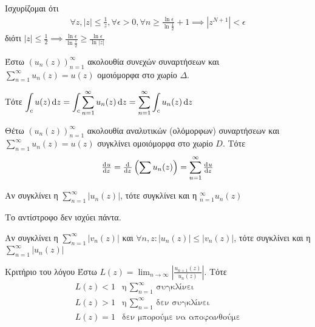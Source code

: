 \documentclass[12pt,a4paper,titlepage,fleqn]{article}
\begin{document}
     Ισχυρίζομαι ότι
     \begin{align*}
     \forall z,|z|\leq\frac{1}{z}, \forall \epsilon>0, \forall n \geq
     \frac{\ln \epsilon}{\ln\frac{1}{2}}+1\implies\left|z^{N+1}\right|<\epsilon
     \end{align*}
     διότι \( \displaystyle
     |z| \leq \frac{1}{2}\implies
     \frac{\ln\epsilon}{\ln\frac{1}{2}} \geq \frac{\ln\epsilon}{\ln|z|} \)
     
     \begin{theorem*}[width=.7\textwidth]{}
     	Έστω \( \left(u_n(z)\right)_{n=1}^\infty \) ακολουθία συνεχών συναρτήσεων
     	και \( \sum_{n=1}^\infty u_n(z)=u(z) \) ομοιόμορφα στο χωρίο \( \Delta \).
     	
     	Τότε \(\displaystyle
     	\int_c u(z)\dif z = \int_c \sum_{n=1}^\infty u_n(z)\dif z 
     	= \sum_{n=1}^\infty \int_c u_n(z)\dif z
     	\)
     \end{theorem*}
     \begin{theorem*}[width=.7\textwidth]{}
     	Θέτω \( \left( u_n(z) \right)_{n=1}^\infty \) ακολουθία αναλυτικών (ολόμορφων)
     	συναρτήσεων και \( \sum_{n=1}^\infty u_n(z) = u(z)\) συγκλίνει ομοιόμορφα
     	στο χωρίο \( D \). Τότε \[
     	\od{u}{z} = \od{}{z}\left(\sum u_n(z) \right) = \sum_{u=1}^\infty
     	\od{u}{z}
     	\]
     \end{theorem*}
     
     \begin{theorem*}{}
     	Αν συγκλίνει η \( \displaystyle \sum_{n=1}^\infty \left|u_n(z)\right| \),
     	τότε συγκλίνει και η \( \displaystyle_{n=1}^\infty u_n(z)\)
     	
     	Το αντίστροφο δεν ισχύει πάντα.
     \end{theorem*}
     
     \begin{theorem*}{}
     	Αν συγκλίνει η \( \displaystyle \sum_{n=1}^\infty \left|v_n(z)\right| \)
     	και \( \forall n,z:\left|u_n(z)\right| \leq \left|v_n(z)\right|\),
        τότε συγκλίνει και η \( \displaystyle \sum_{n=1}^\infty \left|
        u_n(z)
        \right| \)
     \end{theorem*}
     
     \begin{theorem*}{Κριτήριο του λόγου}
     	Έστω \( \displaystyle L(z) = \lim_{n\to \infty} \left|
     	\frac{u_{n+1}(z)}{u_n(z)}
     	\right| \). Τότε
     	\[
     	\begin{array}{ll}
     	L(z) < 1 & \text{η $\displaystyle\sum_{n=1}^\infty$ συγκλίνει} \\
     	L(z) > 1 & \text{η $\displaystyle\sum_{n=1}^\infty$ δεν συγκλίνει} \\
     	L(z) = 1 & \text{δεν μπορούμε να αποφανθούμε} \\
     	\end{array}
     	\]
     \end{theorem*}
 
\end{document}
